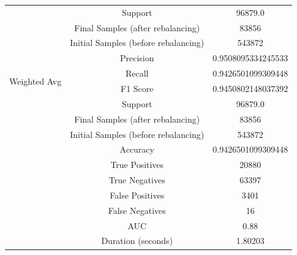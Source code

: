 \begin{longtable}{|c|c|c|}
 & Support & 96879.0 \\
 & Final Samples (after rebalancing) & 83856 \\
 & Initial Samples (before rebalancing) & 543872 \\
\hline
\multirow{4}{*}{Weighted Avg} & Precision & 0.9508095334245533 \\
 & Recall & 0.9426501099309448 \\
 & F1 Score & 0.9450802148037392 \\
 & Support & 96879.0 \\
 & Final Samples (after rebalancing) & 83856 \\
 & Initial Samples (before rebalancing) & 543872 \\
\hline
& Accuracy & 0.9426501099309448 \\ \hline
& True Positives & 20880 \\ \hline
& True Negatives & 63397 \\ \hline
& False Positives & 3401 \\ \hline
& False Negatives & 16 \\ \hline
& AUC & 0.88 \\ \hline
& Duration (seconds) & 1.80203 \\ \hline
\end{longtable}


